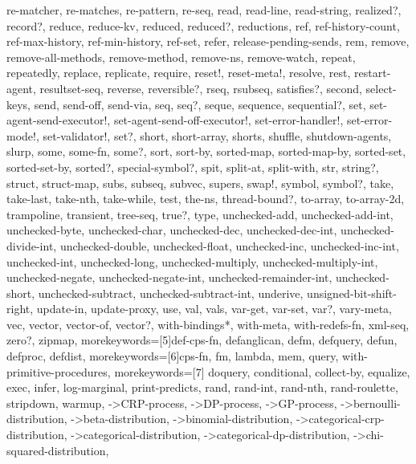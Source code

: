 {{    re-matcher, re-matches, re-pattern, re-seq, read, read-line, read-string, %
    realized?, record?, reduce, reduce-kv, reduced, reduced?, reductions, ref, %
    ref-history-count, ref-max-history, ref-min-history, ref-set, refer, %
    release-pending-sends, rem, remove, remove-all-methods, remove-method, %
    remove-ns, remove-watch, repeat, repeatedly, replace, replicate, require, %
    reset!, reset-meta!, resolve, rest, restart-agent, resultset-seq, reverse, %
    reversible?, rseq, rsubseq, satisfies?, second, select-keys, send, send-off, %
    send-via, seq, seq?, seque, sequence, sequential?, set, %
    set-agent-send-executor!, set-agent-send-off-executor!, set-error-handler!, %
    set-error-mode!, set-validator!, set?, short, short-array, shorts, shuffle, %
    shutdown-agents, slurp, some, some-fn, some?, sort, sort-by, sorted-map, %
    sorted-map-by, sorted-set, sorted-set-by, sorted?, special-symbol?, spit, %
    split-at, split-with, str, string?, struct, struct-map, subs, subseq, %
    subvec, supers, swap!, symbol, symbol?, take, take-last, take-nth, %
    take-while, test, the-ns, thread-bound?, to-array, to-array-2d, trampoline, %
    transient, tree-seq, true?, type, unchecked-add, unchecked-add-int, %
    unchecked-byte, unchecked-char, unchecked-dec, unchecked-dec-int, %
    unchecked-divide-int, unchecked-double, unchecked-float, unchecked-inc, %
    unchecked-inc-int, unchecked-int, unchecked-long, unchecked-multiply, %
    unchecked-multiply-int, unchecked-negate, unchecked-negate-int, %
    unchecked-remainder-int, unchecked-short, unchecked-subtract, %
    unchecked-subtract-int, underive, unsigned-bit-shift-right, update-in, %
    update-proxy, use, val, vals, var-get, var-set, var?, vary-meta, vec, %
    vector, vector-of, vector?, with-bindings*, with-meta, with-redefs-fn, %
    xml-seq, zero?, zipmap}, %
  morekeywords=[5]{def-cps-fn, defanglican, defm, defquery, defun, defproc, defdist}, %
  morekeywords=[6]{cps-fn, fm, lambda, mem, query, with-primitive-procedures}, %
  morekeywords=[7]{%
    doquery, %
    conditional, %
    collect-by, equalize, exec, infer, log-marginal, print-predicts, %
    rand, rand-int, rand-nth, rand-roulette, stripdown, warmup, %
    ->CRP-process, ->DP-process, ->GP-process, %
    ->bernoulli-distribution, ->beta-distribution, ->binomial-distribution, %
    ->categorical-crp-distribution, ->categorical-distribution, %
    ->categorical-dp-distribution, ->chi-squared-distribution, %
}}
